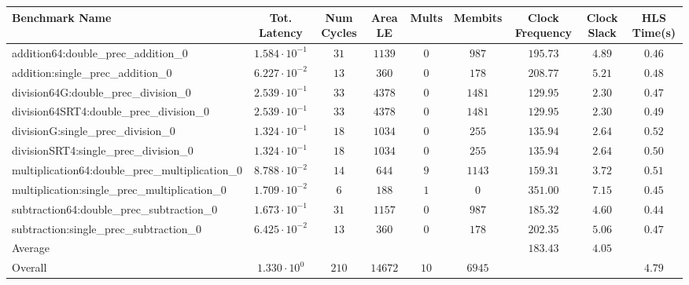 \begin{tabular}{|l|c|c|c|c|c|c|c|c|}
\hline
Benchmark Name                                   & Tot. Latency            & Num Cycles & Area LE   & Mults  & Membits  & Clock Frequency & Clock Slack & HLS Time(s) \\
\hline
addition64:double\_prec\_addition\_0             & $ 1.584 \cdot 10^{-1} $ & $ 31     $ & $ 1139  $ & $ 0  $ & $ 987  $ & $ 195.73      $ & $ 4.89    $ & $ 0.46    $ \\
addition:single\_prec\_addition\_0               & $ 6.227 \cdot 10^{-2} $ & $ 13     $ & $ 360   $ & $ 0  $ & $ 178  $ & $ 208.77      $ & $ 5.21    $ & $ 0.48    $ \\
division64G:double\_prec\_division\_0            & $ 2.539 \cdot 10^{-1} $ & $ 33     $ & $ 4378  $ & $ 0  $ & $ 1481 $ & $ 129.95      $ & $ 2.30    $ & $ 0.47    $ \\
division64SRT4:double\_prec\_division\_0         & $ 2.539 \cdot 10^{-1} $ & $ 33     $ & $ 4378  $ & $ 0  $ & $ 1481 $ & $ 129.95      $ & $ 2.30    $ & $ 0.49    $ \\
divisionG:single\_prec\_division\_0              & $ 1.324 \cdot 10^{-1} $ & $ 18     $ & $ 1034  $ & $ 0  $ & $ 255  $ & $ 135.94      $ & $ 2.64    $ & $ 0.52    $ \\
divisionSRT4:single\_prec\_division\_0           & $ 1.324 \cdot 10^{-1} $ & $ 18     $ & $ 1034  $ & $ 0  $ & $ 255  $ & $ 135.94      $ & $ 2.64    $ & $ 0.50    $ \\
multiplication64:double\_prec\_multiplication\_0 & $ 8.788 \cdot 10^{-2} $ & $ 14     $ & $ 644   $ & $ 9  $ & $ 1143 $ & $ 159.31      $ & $ 3.72    $ & $ 0.51    $ \\
multiplication:single\_prec\_multiplication\_0   & $ 1.709 \cdot 10^{-2} $ & $ 6      $ & $ 188   $ & $ 1  $ & $ 0    $ & $ 351.00      $ & $ 7.15    $ & $ 0.45    $ \\
subtraction64:double\_prec\_subtraction\_0       & $ 1.673 \cdot 10^{-1} $ & $ 31     $ & $ 1157  $ & $ 0  $ & $ 987  $ & $ 185.32      $ & $ 4.60    $ & $ 0.44    $ \\
subtraction:single\_prec\_subtraction\_0         & $ 6.425 \cdot 10^{-2} $ & $ 13     $ & $ 360   $ & $ 0  $ & $ 178  $ & $ 202.35      $ & $ 5.06    $ & $ 0.47    $ \\
\hline
Average                                          & $                     $ & $        $ & $       $ & $    $ & $      $ & $ 183.43      $ & $ 4.05    $ & $         $ \\
\hline
Overall                                          & $ 1.330 \cdot 10^{0}  $ & $ 210    $ & $ 14672 $ & $ 10 $ & $ 6945 $ & $             $ & $         $ & $ 4.79    $ \\
\hline
\end{tabular}
